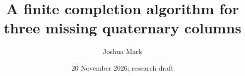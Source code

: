 \documentclass[11pt]{article}
\begin{document}
\title{A finite completion algorithm for three missing quaternary columns}
\author{Joshua Mark}\date{20 November 2026; research draft}
\maketitle
\end{document}
